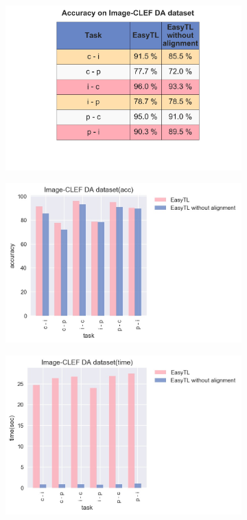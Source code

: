 \begin{figure}
	\centering
	\begin{subfigure}[b]{0.3\textwidth}
		\centering
		\includegraphics[width=\linewidth]{images/2_1.jpg}
		\caption{}
	\end{subfigure}%
	\begin{subfigure}[b]{0.35\textwidth}
		\centering
		\includegraphics[width=\linewidth]{images/2_2.jpg}
		\caption{}
	\end{subfigure}%
	\begin{subfigure}[b]{0.35\textwidth}
		\centering
		\includegraphics[width=\linewidth]{images/2_3.jpg}

\end{subfigure}
\end{figure}
